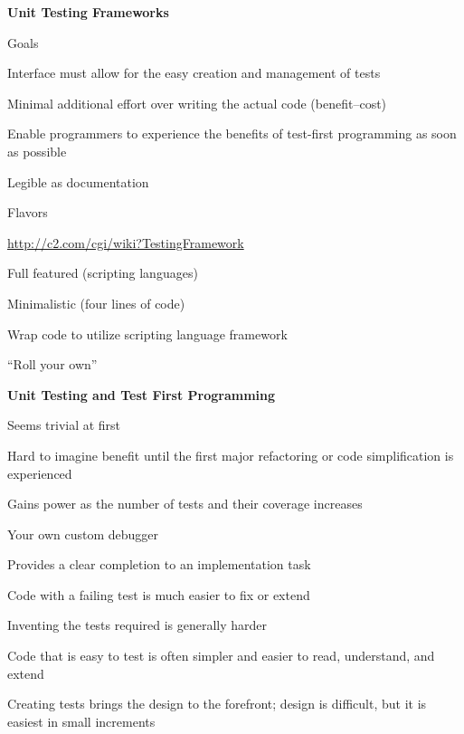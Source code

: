 \documentclass[landscape]{slides}
\renewcommand{\title}[1]{{\large\bfseries #1}}
\newenvironment{itemiz}%
  {\begin{list}{}{\raggedright
      \setlength{\itemsep}{2pt}%
      \setlength{\parskip}{4pt}\setlength{\parsep}{2pt}}}%
  {\end{list}}%
\begin{document}
 \begin{slide}
   \title{Unit Testing Frameworks}
   \begin{itemiz}
   \item Goals
     \begin{itemiz}
     \item Interface must allow for the easy creation and management of tests
     \item Minimal additional effort over writing the actual code
     (benefit--cost)
     \item Enable programmers to experience the benefits of test-first
       programming as soon as possible
     \item Legible as documentation
     \end{itemiz}
   \item Flavors
     \begin{itemiz}
     \item \url{http://c2.com/cgi/wiki?TestingFramework}
     \item Full featured (scripting languages)
     \item Minimalistic (four lines of code)
     \item Wrap code to utilize scripting language framework
     \item ``Roll your own''
     \end{itemiz}
   \end{itemiz}
 \end{slide}
 
 \begin{slide}
   \title{ Unit Testing and Test First Programming}
   \begin{itemiz}
   \item Seems trivial at first
   \item Hard to imagine benefit until the first major refactoring or
     code simplification is experienced
   \item Gains power as the number of tests and their coverage increases
   \item Your own custom debugger
   \item Provides a clear completion to an implementation task
   \item Code with a failing test is much easier to fix or extend
   \item Inventing the tests required is generally harder
   \item Code that is easy to test is often simpler and easier to
   read, understand, and extend
   \item Creating tests brings the design to the forefront; design is
   difficult, but it is easiest in small increments
   \end{itemiz}
 \end{slide}
   
\end{document}

